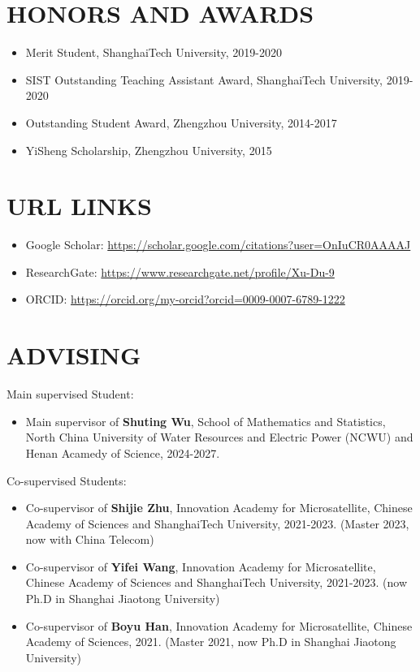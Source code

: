 \documentclass[paper=a4,fontsize=11pt]{scrartcl} %
\newcommand{\sepspace}{\vspace*{1em}}		%
\newcommand{\NewPart}[1]{\section*{\uppercase{#1}}}
\newcommand{\EducationEntry}[4]{
		\noindent \textbf{#1} \hfill      %
		\colorbox{White}{%
			\parbox{5cm}{%
			\hfill\color{Black}#2}} \par  %
		\noindent \textit{#3} \par        %
		\noindent\hangindent=2em\hangafter=0 \small #4 %
		\normalsize \par}
\begin{document}
\NewPart{HONORS AND AWARDS}
\begin{itemize}
	\item Merit Student, ShanghaiTech University, 2019-2020
	
	\item SIST Outstanding Teaching Assistant Award, ShanghaiTech University, 2019-2020
		
	
	\item Outstanding Student Award, Zhengzhou University, 2014-2017
	
	\item YiSheng Scholarship, Zhengzhou University, 2015
	
	
	\end{itemize}
%
\NewPart{URL Links}
\begin{itemize}
	\item Google Scholar: \url{https://scholar.google.com/citations?user=OnIuCR0AAAAJ}
	\item ResearchGate: \url{https://www.researchgate.net/profile/Xu-Du-9}
	\item ORCID: \url{https://orcid.org/my-orcid?orcid=0009-0007-6789-1222}
\end{itemize}

\NewPart{Advising}

Main supervised Student:
\begin{itemize}
		\item Main supervisor of \textbf{Shuting Wu}, School of Mathematics and Statistics, North China University of Water Resources and Electric Power (NCWU) and Henan Acamedy of Science, 2024-2027. 
\end{itemize}

Co-supervised Students:
\begin{itemize}
	
	
	
	\item Co-supervisor of \textbf{Shijie Zhu}, Innovation Academy for Microsatellite, Chinese Academy
	of Sciences and ShanghaiTech University, 2021-2023. (Master 2023, now with China
	Telecom)
	
	
	\item Co-supervisor of \textbf{Yifei Wang}, Innovation Academy for Microsatellite, Chinese
	Academy of Sciences and ShanghaiTech University, 2021-2023. (now Ph.D in Shanghai Jiaotong University)
	
	\item Co-supervisor of \textbf{Boyu Han}, Innovation Academy for Microsatellite, Chinese Academy
	of Sciences, 2021. (Master 2021, now Ph.D in Shanghai Jiaotong University)
\end{itemize}
\end{document}
